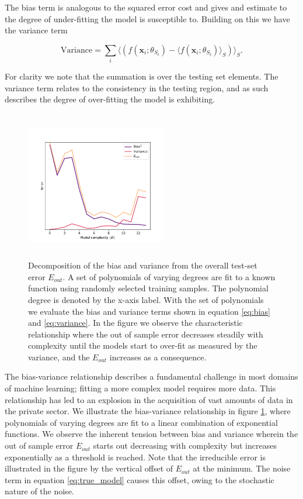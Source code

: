 \noindent The bias term is analogous to the squared error cost and gives and estimate to the degree of under-fitting the model is susceptible to. Building on this we have the variance term 

\begin{equation}\label{eq:variance}
\text{Variance} = \sum_i \langle (f(\boldsymbol{x}_i; \theta_{S_t}) - \langle f(\boldsymbol{x}_i; \theta_{S_t}) \rangle_S)\rangle_S.
\end{equation}

\noindent For clarity we note that the summation is over the testing set elements. The variance term relates to the consistency in the testing region, and as such describes the degree of over-fitting the model is exhibiting.

\begin{figure}
\centering
\includegraphics[width=0.55\textwidth, height=6.5cm]{../figures/bias_var_degree.pdf}
\caption[Bias-variance decomposition ]{Decomposition of the bias and variance from the overall test-set error $E_{out}$. A set of polynomials of varying degrees are fit to a known function using randomly selected training samples. The polynomial degree is denoted by the x-axis label. With the set of polynomials we evaluate the bias and variance terms shown in equation \ref{eq:bias} and \ref{eq:variance}. In the figure we observe the characteristic relationship where the out of sample error decreases steadily with complexity until the models start to over-fit as measured by the variance, and the $E_{out}$ increases as a consequence.}\label{fig:bv}
\end{figure}

The bias-variance relationship describes a fundamental challenge in most domains of machine learning; fitting a more complex model requires more data. This relationship has led to an explosion in the acquisition of vast amounts of data in the private sector. We illustrate the bias-variance relationship in figure \ref{fig:bv}, where polynomials of varying degrees are fit to a linear combination of exponential functions. We observe the inherent tension between bias and variance wherein the out of sample error $E_{out}$ starts out decreasing with complexity but increases exponentially as a threshold is reached. Note that the irreducible error is illustrated in the figure by the vertical offset of $E_{out}$ at the minimum.  The noise term in equation \ref{eq:true_model} causes this offset, owing to the stochastic nature of the noise.  

